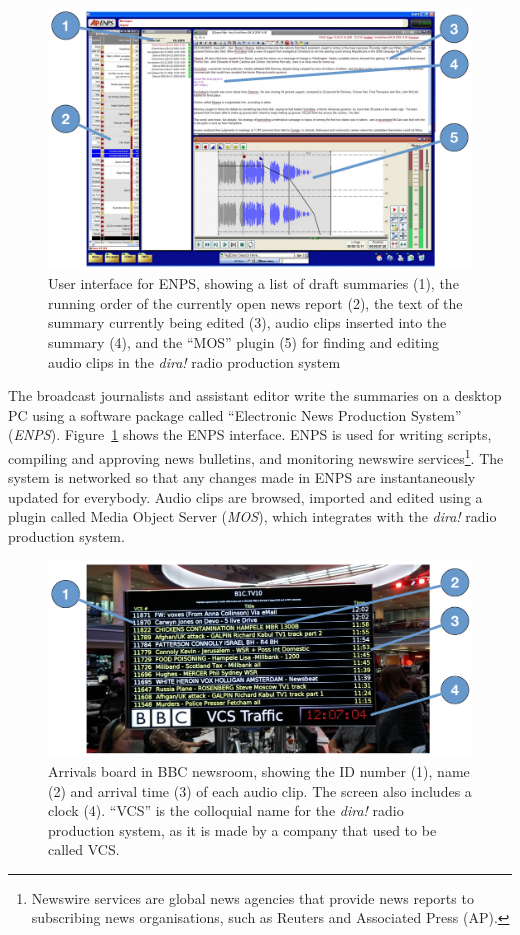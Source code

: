 \begin{figure}
  \centering
  \includegraphics[width=\columnwidth]{figs/news-enps-labelled.pdf}
  \caption{User interface for ENPS, showing a list of draft summaries (1), the running order of the currently open news
  report (2), the text of the summary currently being edited (3), audio clips inserted into the summary (4), and the
  ``MOS'' plugin (5) for finding and editing audio clips in the \textit{dira!} radio production system}
  \label{fig:news-enps-edit}
\end{figure}

The broadcast journalists and assistant editor write the summaries on a desktop PC using a software package called
``Electronic News Production System'' (\textit{ENPS}). Figure~\ref{fig:news-enps-edit} shows the ENPS interface. ENPS
is used for writing scripts, compiling and approving news bulletins, and monitoring newswire services\footnote{Newswire
services are global news agencies that provide news reports to subscribing news organisations, such as Reuters and
Associated Press (AP).}. The system is networked so that any changes made in ENPS are instantaneously updated for
everybody. Audio clips are browsed, imported and edited using a plugin called Media Object Server (\textit{MOS}), which
integrates with the \textit{dira!} radio production system.

\begin{figure}
  \centering
  \includegraphics[width=\columnwidth]{figs/arrivals-board-labelled.pdf}
  \caption{Arrivals board in BBC newsroom, showing the ID number (1), name (2) and arrival time (3) of each audio clip.
  The screen also includes a clock (4). ``VCS'' is the colloquial name for the \textit{dira!} radio production system,
  as it is made by a company that used to be called VCS.}
  \label{fig:news-arrivals}
\end{figure}

